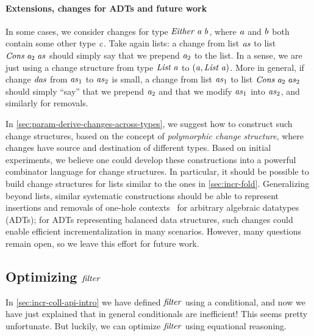 \paragraph{Extensions, changes for ADTs and future work}
In some cases, we consider changes for type \ensuremath{\Conid{Either}\;\Varid{a}\;\Varid{b}}, where \ensuremath{\Varid{a}} and \ensuremath{\Varid{b}} both
contain some other type \ensuremath{\Varid{c}}. Take again lists: a change from
list \ensuremath{\Varid{as}} to list \ensuremath{\Conid{Cons}\;\Varid{a}_{2}\;\Varid{as}} should simply say that we prepend \ensuremath{\Varid{a}_{2}} to the
list. In a sense, we are just using a change structure from type \ensuremath{\Conid{List}\;\Varid{a}} to
\ensuremath{(\Varid{a},\Conid{List}\;\Varid{a})}.
More in general, if change \ensuremath{\Varid{das}} from \ensuremath{\Varid{as}_{1}} to \ensuremath{\Varid{as}_{2}} is small, a change from
list \ensuremath{\Varid{as}_{1}} to list \ensuremath{\Conid{Cons}\;\Varid{a}_{2}\;\Varid{as}_{2}} should simply ``say'' that we prepend \ensuremath{\Varid{a}_{2}} and
that we modify \ensuremath{\Varid{as}_{1}} into \ensuremath{\Varid{as}_{2}}, and similarly for removals.

In \cref{sec:param-derive-changes-across-types}, we suggest how to
construct such change structures, based on the concept of \emph{polymorphic
  change structure}, where changes have source and destination of different
types. Based on initial experiments, we believe one could develop these
constructions into a powerful combinator language for change structures. In particular,
it should be possible to build change structures for lists similar to the ones
in \cref{sec:incr-fold}. Generalizing beyond lists, similar systematic constructions
should be able to represent insertions and removals of one-hole
contexts~\citep{McBride2001derivative} for
arbitrary algebraic datatypes (ADTs); for ADTs representing balanced data
structures, such changes could enable efficient incrementalization in many
scenarios.
However, many questions remain open, so we leave this effort for future work.

\subsection{Optimizing \ensuremath{\Varid{filter}}}
In \cref{sec:incr-coll-api-intro} we have defined \ensuremath{\Varid{filter}} using a conditional,
and now we have just explained that in general conditionals are inefficient!
This seems pretty unfortunate. But luckily, we can optimize \ensuremath{\Varid{filter}} using
equational reasoning.

